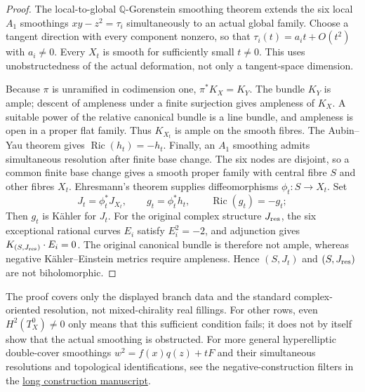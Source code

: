 \documentclass[a4paper,11pt]{article}
\numberwithin{equation}{section}
\theoremstyle{definition}
\newcommand{\Ric}{\operatorname{Ric}}
\begin{document}
\begin{proof}
The local-to-global $\mathbb Q$-Gorenstein smoothing theorem
\cite[Proposition 2.4(2)]{LeePark}
extends the six local $A_1$ smoothings $xy-z^2=\tau_i$ simultaneously to an actual global family.
Choose a tangent direction with every component nonzero, so that
$\tau_i(t)=a_it+O(t^2)$ with $a_i\ne0$. Every $X_t$ is smooth for sufficiently small $t\ne0$.
This uses unobstructedness of the actual deformation, not only a tangent-space dimension.

Because $\pi$ is unramified in codimension one, $\pi^*K_X=K_Y$.
The bundle $K_Y$ is ample; descent of ampleness under a finite surjection gives ampleness of $K_X$.
A suitable power of the relative canonical bundle is a line bundle, and ampleness is open in a proper flat family. Thus $K_{X_t}$ is ample on the smooth fibres.
The Aubin--Yau theorem gives $\Ric(h_t)=-h_t$.
Finally, an $A_1$ smoothing admits simultaneous resolution after finite base change.
The six nodes are disjoint, so a common finite base change gives a smooth proper family
with central fibre $S$ and other fibres $X_t$.
Ehresmann's theorem supplies diffeomorphisms $\phi_t:S\to X_t$. Set
\begin{equation}\label{eq:bcgp-pullback-ke}
J_t=\phi_t^*J_{X_t},\qquad g_t=\phi_t^*h_t,
\qquad \Ric(g_t)=-g_t;
\end{equation}
Then $g_t$ is K\"ahler for $J_t$.
For the original complex structure $J_{\rm res}$, the six exceptional rational curves $E_i$ satisfy
$E_i^2=-2$, and adjunction gives $K_{(S,J_{\rm res})}\cdot E_i=0$.
The original canonical bundle is therefore not ample, whereas negative K\"ahler--Einstein metrics require ampleness.
Hence $(S,J_t)$ and $(S,J_{\rm res})$ are not biholomorphic.
\end{proof}

The proof covers only the displayed branch data and the standard complex-oriented resolution, not mixed-chirality real fillings.
For other rows, even $H^2(T_X^0)\ne0$ only means that this sufficient condition fails; it does not by itself show that the actual smoothing is obstructed.
For more general hyperelliptic double-cover smoothings
$w^2=f(x)q(z)+tF$
and their simultaneous resolutions and topological identifications, see the negative-construction filters in the \href{20260912.tex}{long construction manuscript}.
\end{document}
